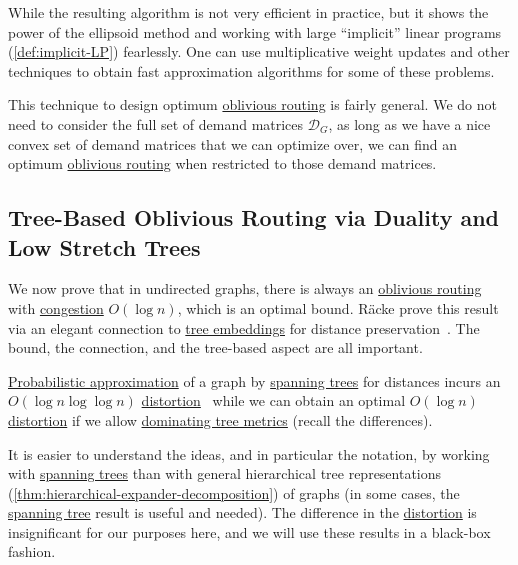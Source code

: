 While the resulting algorithm is not very efficient in practice, but it shows the power of the ellipsoid method and working with large ``implicit'' linear programs (\autoref{def:implicit-LP}) fearlessly. One can use multiplicative weight updates and other techniques to obtain fast approximation algorithms for some of these problems.

\begin{remark}
	This technique to design optimum \hyperref[def:edge-based-oblivious-routing]{oblivious routing} is fairly general. We do not need to consider the full set of demand matrices \(\mathcal{D} _G\), as long as we have a nice convex set of demand matrices that we can optimize over, we can find an optimum \hyperref[def:edge-based-oblivious-routing]{oblivious routing} when restricted to those demand matrices.
\end{remark}

\subsection{Tree-Based Oblivious Routing via Duality and Low Stretch Trees}
We now prove that in undirected graphs, there is always an \hyperref[def:edge-based-oblivious-routing]{oblivious routing} with \hyperref[def:congestion-of-oblivious-routing]{congestion} \(O(\log n)\), which is an optimal bound. Räcke prove this result via an elegant connection to \hyperref[prb:tree-embedding]{tree embeddings} for distance preservation~\cite{racke2008optimal}. The bound, the connection, and the tree-based aspect are all important.

\begin{prev}
	\hyperref[def:probabilistic-approximation]{Probabilistic approximation} of a graph by \hyperref[def:spanning-tree]{spanning trees} for distances incurs an \(O(\log n \log \log n)\) \hyperref[def:distortion]{distortion}~\cite{abraham2008nearly} while we can obtain an optimal \(O(\log n)\) \hyperref[def:distortion]{distortion} if we allow \hyperref[def:dominating-tree-metric]{dominating tree metrics} (recall the differences).
\end{prev}

It is easier to understand the ideas, and in particular the notation, by working with \hyperref[def:spanning-tree]{spanning trees} than with general hierarchical tree representations (\autoref{thm:hierarchical-expander-decomposition}) of graphs (in some cases, the \hyperref[def:spanning-tree]{spanning tree} result is useful and needed). The difference in the \hyperref[def:distortion]{distortion} is insignificant for our purposes here, and we will use these results in a black-box fashion.

